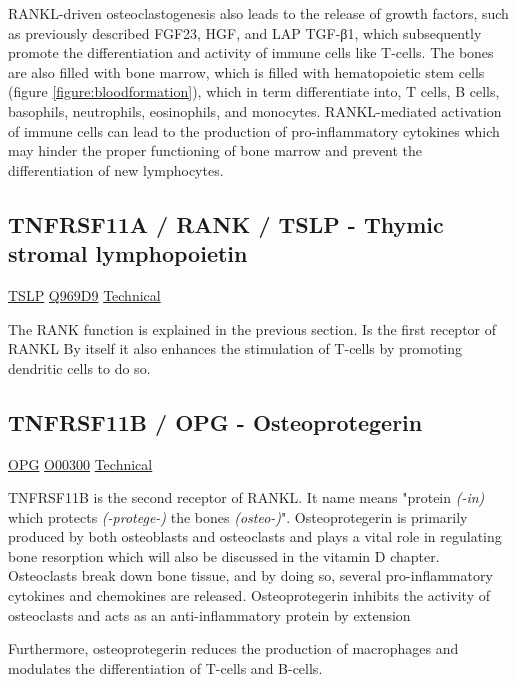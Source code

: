 RANKL-driven osteoclastogenesis also leads to the release of growth factors, such as previously described FGF23, HGF, and LAP TGF-β1, which subsequently promote the differentiation and activity of immune cells like T-cells. The bones are also filled with bone marrow, which is filled with hematopoietic stem cells (figure \ref{figure:bloodformation}), which in term differentiate into, T cells, B cells, basophils, neutrophils, eosinophils, and monocytes. RANKL-mediated activation of immune cells can lead to the production of pro-inflammatory cytokines which may hinder the proper functioning of bone marrow and prevent the differentiation of new lymphocytes.

\subsection{TNFRSF11A / RANK / TSLP - Thymic stromal lymphopoietin}

\href{https://en.wikipedia.org/wiki/Thymic \textunderscore stromal \textunderscore lymphopoietin}{TSLP}
\href{http://www.uniprot.org/uniprot/Q969D9}{Q969D9}
\href{https://olink.com/products-services/target/protein/?assayID=5062}{Technical}

The RANK function is explained in the previous section. Is the first receptor of RANKL By itself it also enhances the stimulation of T-cells by promoting  dendritic cells to do so.

\subsection{TNFRSF11B / OPG - Osteoprotegerin}

\href{https://en.wikipedia.org/wiki/Osteoprotegerin}{OPG}
\href{http://www.uniprot.org/uniprot/O00300}{O00300}
\href{https://olink.com/products-services/target/protein/?assayID=5070}{Technical}

TNFRSF11B is the second receptor of RANKL. It name means "protein \textit{(-in)} which protects \textit{(-protege-)} the bones \textit{(osteo-)}". Osteoprotegerin is primarily produced by both osteoblasts and osteoclasts and plays a vital role in regulating bone resorption which will also be discussed in the vitamin D chapter. Osteoclasts break down bone tissue, and by doing so, several pro-inflammatory cytokines and chemokines are released. Osteoprotegerin inhibits the activity of osteoclasts and acts as an anti-inflammatory protein by extension

Furthermore, osteoprotegerin reduces the production of macrophages and modulates the differentiation of T-cells and B-cells.

